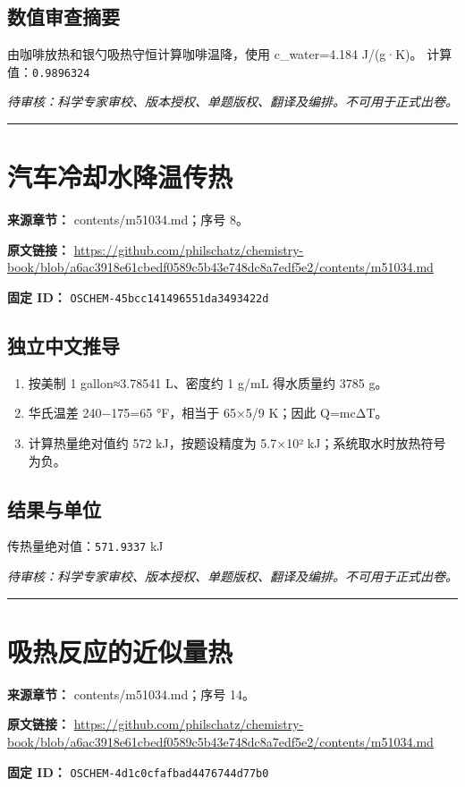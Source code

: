 \documentclass[UTF8,11pt,oneside,openany,fontset=none]{ctexbook}
\begin{document}
\subsection*{数值审查摘要}
由咖啡放热和银勺吸热守恒计算咖啡温降，使用 c\_water=4.184 J/(g·K)。
\noindent 计算值：\texttt{0.9896324}\par
\noindent\textit{待审核：科学专家审校、版本授权、单题版权、翻译及编排。不可用于正式出卷。}
\medskip\hrule\medskip
\section{汽车冷却水降温传热}
\noindent\textbf{来源章节：} contents/m51034.md；序号 8。\par
\noindent\textbf{原文链接：} \url{https://github.com/philschatz/chemistry-book/blob/a6ac3918e61cbedf0589c5b43e748dc8a7edf5e2/contents/m51034.md}\par
\noindent\textbf{固定 ID：} \texttt{OSCHEM-45bcc141496551da3493422d}\par
\subsection*{独立中文推导}
\begin{enumerate}
\item 按美制 1 gallon≈3.78541 L、密度约 1 g/mL 得水质量约 3785 g。
\item 华氏温差 240−175=65 °F，相当于 65×5/9 K；因此 Q=mcΔT。
\item 计算热量绝对值约 572 kJ，按题设精度为 5.7×10² kJ；系统取水时放热符号为负。
\end{enumerate}
\subsection*{结果与单位}
\noindent 传热量绝对值：\texttt{571.9337} kJ\par
\noindent\textit{待审核：科学专家审校、版本授权、单题版权、翻译及编排。不可用于正式出卷。}
\medskip\hrule\medskip
\section{吸热反应的近似量热}
\noindent\textbf{来源章节：} contents/m51034.md；序号 14。\par
\noindent\textbf{原文链接：} \url{https://github.com/philschatz/chemistry-book/blob/a6ac3918e61cbedf0589c5b43e748dc8a7edf5e2/contents/m51034.md}\par
\noindent\textbf{固定 ID：} \texttt{OSCHEM-4d1c0cfafbad4476744d77b0}\par
\end{document}
